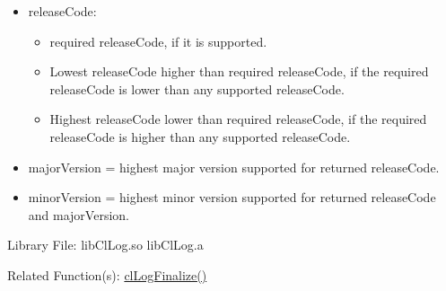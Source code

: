 \begin{flushleft}
\begin{Desc}
\begin{itemize}
\item
releaseCode:
	\begin{itemize}
	\item
	required releaseCode, if it is supported.
	\item
	Lowest releaseCode higher than required releaseCode, if the required releaseCode is lower than any supported releaseCode.
	\item
	Highest releaseCode lower than required releaseCode, if the required releaseCode is higher than any supported releaseCode.
	\end{itemize}
\item
majorVersion = highest major version supported for returned releaseCode.
\item
minorVersion = highest minor version supported for returned releaseCode and majorVersion.
\end{itemize}
\end{Desc}
\begin{Desc}
\item[Library File:] libClLog.so
\newline
libClLog.a
\end{Desc}
\begin{Desc}
\item[Related Function(s):]\hyperlink{pagelog104}{clLogFinalize()}\end{Desc}
\newpage




\end{flushleft}
